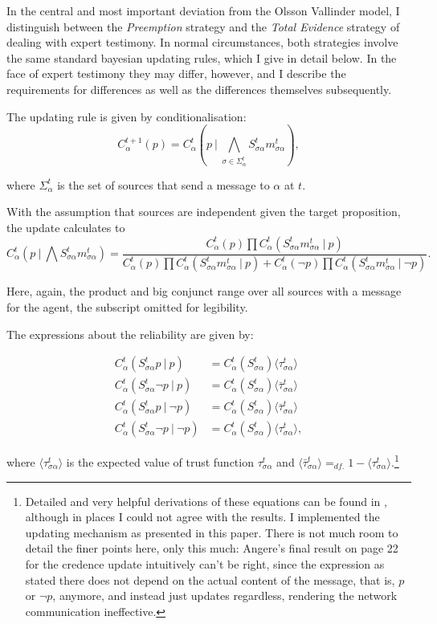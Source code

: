 \documentclass[11pt, a4paper]{article}
\newcommand{\Stsa}{S^t_{\sigma\alpha}}
\newcommand{\sa}{{\sigma\alpha}}
\newcommand{\given}[1][]{\:#1\vert\:}
\newcommand{\Sm}{\Stsa m^t_{\sa}}
\renewcommand{\i}[1]{\emph{#1}}
\renewcommand{\a}{\alpha}
\begin{document}
In the central and most important deviation from the Olsson Vallinder model, I distinguish between the \i{Preemption} strategy and the \i{Total Evidence} strategy of dealing with expert testimony. In normal circumstances, both strategies involve the same standard bayesian updating rules, which I give in detail below. In the face of expert testimony they may differ, however, and I describe the requirements for differences as well as the differences themselves subsequently. 

The updating rule is given by conditionalisation:
\[
    C^{t+1}_\alpha (p) = C^t_\alpha (p \given \bigwedge_{\sigma \in \Sigma^t_\alpha} \Stsa m^t_{\sa}),
\]

where $\Sigma^t_\alpha$ is the set of sources that send a message to $\alpha$ at $t$.

With the assumption that sources are independent given the target proposition, the update calculates to
\[
    C^t_\a (p \given \bigwedge \Sm) 
    = \frac{ C^t_\a (p) \prod C^t_\a (\Sm \given p) }
    { C^t_\a (p) \prod C^t_\a (\Sm \given p) +  C^t_\a (\neg p) \prod C^t_\a (\Sm \given \neg p) }.
\]

Here, again, the product and big conjunct range over all sources with a message for the agent, the subscript omitted for legibility.   

The expressions about the reliability are given by:

\begin{align*}
    C^t_\a (\Stsa p \given p) &= C^t_\a (\Stsa) \langle \tau^t_{\sa} \rangle \\
    C^t_\a (\Stsa \neg p \given p) &= C^t_\a (\Stsa) \langle \bar{\tau}^t_{\sa} \rangle \\
    C^t_\a (\Stsa p \given \neg p) &= C^t_\a (\Stsa) \langle \bar{\tau}^t_{\sa} \rangle \\
    C^t_\a (\Stsa \neg p \given \neg p) &= C^t_\a (\Stsa) \langle \tau^t_{\sa} \rangle,
\end{align*}

where $\langle \tau^t_{\sa} \rangle $ is the expected value of trust function $ \tau^t_{\sa} $ and ${\langle \bar{\tau}^t_{\sa} \rangle =_{df.} 1 - \langle \tau^t_{\sa} \rangle}$.\footnote{Detailed and very helpful derivations of these equations can be found in \textcite{Angere2010}, although in places I could not agree with the results. I implemented the updating mechanism as presented in this paper. There is not much room to detail the finer points here, only this much: Angere's final result on page 22 for the credence update intuitively can't be right, since the expression as stated there does not depend on the actual content of the message, that is, $p$ or $\neg p$, anymore, and instead just updates regardless, rendering the network communication ineffective.} 
\end{document}
